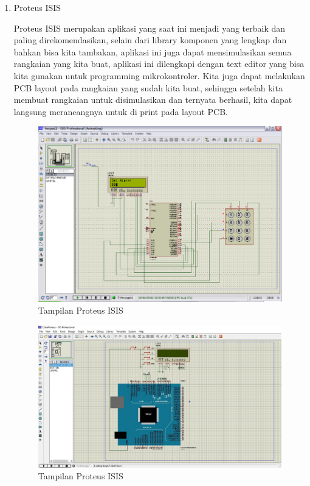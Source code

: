 \begin{enumerate}
    \item Proteus ISIS
    \par Proteus ISIS merupakan aplikasi yang saat ini menjadi yang terbaik dan paling direkomendasikan, selain dari library komponen yang lengkap dan bahkan bisa kita tambakan, aplikasi ini juga dapat mensimulasikan semua rangkaian yang kita buat, aplikasi ini dilengkapi dengan text editor yang bisa kita gunakan untuk programming mikrokontroler. Kita juga dapat melakukan PCB layout pada rangkaian yang sudah kita buat, sehingga setelah kita membuat rangkaian untuk disimulasikan dan ternyata berhasil, kita dapat langsung merancangnya untuk di print pada layout PCB.
    \begin{figure}[H]
    \centering
    \includegraphics[width=1\textwidth]{figures/isis1.png}
    \caption{Tampilan Proteus ISIS }
    \label{print}
    \end{figure}
    
    \begin{figure}[H]
    \centering
    \includegraphics[width=1.1\textwidth]{figures/isis2.png}
    \caption{Tampilan Proteus ISIS }
    \label{print}
    \end{figure}
    

\end{enumerate}
